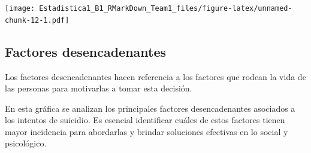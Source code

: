 \documentclass[
]{article}
\begin{document}
\texttt{[image: Estadistica1\_B1\_RMarkDown\_Team1\_files/figure-latex/unnamed-chunk-12-1.pdf]}

\subsection{Factores desencadenantes}\label{factores-desencadenantes}

Los factores desencadenantes hacen referencia a los factores que rodean
la vida de las personas para motivarlas a tomar esta decisión.

En esta gráfica se analizan los principales factores desencadenantes
asociados a los intentos de suicidio. Es esencial identificar cuáles de
estos factores tienen mayor incidencia para abordarlas y brindar
soluciones efectivas en lo social y psicológico.
\end{document}
